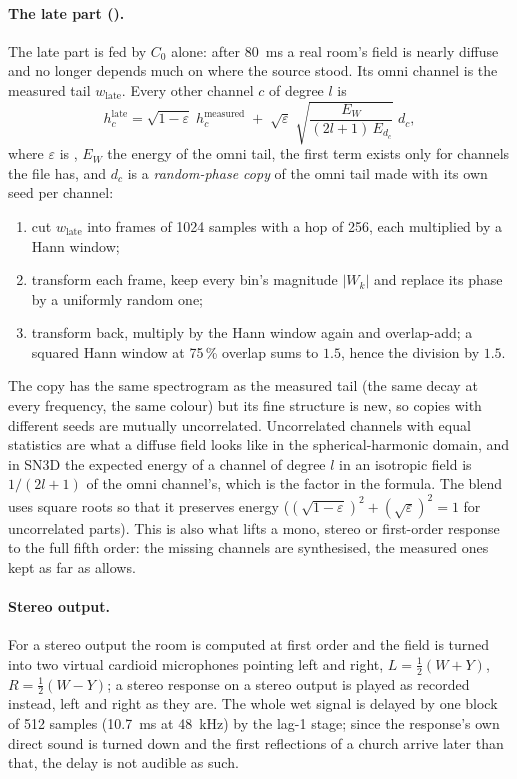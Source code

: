 \paragraph{The late part ().} The late part is fed by $C_0$ alone: after \SI{80}{ms} a real room's
field is nearly diffuse and no longer depends much on where the source stood. Its omni channel is the measured
tail $w_\mathrm{late}$. Every other channel $c$ of degree $l$ is
\begin{equation}
  h_c^\mathrm{late} = \sqrt{1-\varepsilon}\;h_c^\mathrm{measured} \;+\; \sqrt{\varepsilon}\;
  \sqrt{\frac{E_W}{(2l+1)\,E_{d_c}}}\;d_c ,
\end{equation}
where $\varepsilon$ is , $E_W$ the energy of the omni tail, the first term exists only for channels the
file has, and $d_c$ is a \emph{random-phase copy} of the omni tail made with its own seed per channel:
\begin{enumerate}[nosep]
  \item cut $w_\mathrm{late}$ into frames of 1024 samples with a hop of 256, each multiplied by a Hann window;
  \item transform each frame, keep every bin's magnitude $|W_k|$ and replace its phase by a uniformly random one;
  \item transform back, multiply by the Hann window again and overlap-add; a squared Hann window at 75\,\% overlap
    sums to $1.5$, hence the division by $1.5$.
\end{enumerate}
The copy has the same spectrogram as the measured tail (the same decay at every frequency, the same colour) but
its fine structure is new, so copies with different seeds are mutually uncorrelated. Uncorrelated channels with
equal statistics are what a diffuse field looks like in the spherical-harmonic domain, and in SN3D the expected
energy of a channel of degree $l$ in an isotropic field is $1/(2l+1)$ of the omni channel's, which is the factor in
the formula. The blend uses square roots so that it preserves energy ($(\sqrt{1-\varepsilon})^2+(\sqrt\varepsilon)^2 = 1$
for uncorrelated parts). This is also what lifts a mono, stereo or first-order response to the full fifth order: the
missing channels are synthesised, the measured ones kept as far as  allows.

\paragraph{Stereo output.} For a stereo output the room is computed at first order and the field is turned into two
virtual cardioid microphones pointing left and right, $L = \tfrac12(W+Y)$, $R = \tfrac12(W-Y)$; a stereo response on
a stereo output is played as recorded instead, left and right as they are. The whole wet signal is delayed by one
block of 512 samples (\SI{10.7}{ms} at \SI{48}{kHz}) by the lag-1 stage; since the response's own direct sound is
turned down and the first reflections of a church arrive later than that, the delay is not audible as such.
